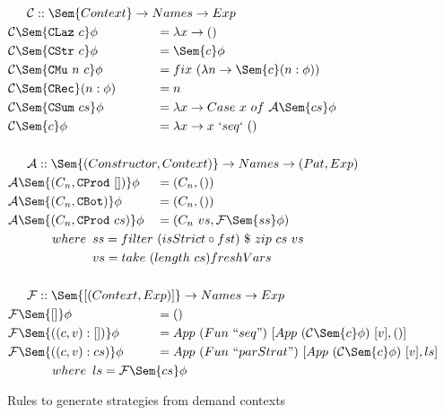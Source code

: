 \begin{figure}[h!]
\begin{displaymath}
  \begin{aligned}
   \noalign{$\mathcal{C} :: \Sem{Context} \rightarrow Names \rightarrow Exp $}
    & \mathcal{C}\Sem{\texttt{CLaz} \   c}    \phi  &&= \lambda x \rightarrow () \\
    & \mathcal{C}\Sem{\texttt{CStr} \  c}     \phi  &&= \Sem{c} \phi \\
    & \mathcal{C}\Sem{\texttt{CMu} \  n \  c} \phi  &&= fix \ (\lambda n \rightarrow \Sem{c} (n:\phi)) \\
    & \mathcal{C}\Sem{\texttt{CRec}}       (n:\phi) &&= n \\
    & \mathcal{C}\Sem{\texttt{CSum} \ cs}     \phi  &&= \lambda x \rightarrow Case \ x \ of \ \mathcal{A}\Sem{cs} \phi \\
    & \mathcal{C}\Sem{c}                      \phi  &&= \lambda x \rightarrow x \  `seq` \ () \\
    & \quad && \\
    \noalign{$\mathcal{A} :: \Sem{(Constructor, Context)} \rightarrow Names \rightarrow (Pat, Exp) $}
    & \mathcal{A}\Sem{(C_{n}, \texttt{CProd} \  [])} \phi &&= (C_{n}, ()) \\
    & \mathcal{A}\Sem{(C_{n}, \texttt{CBot})}        \phi &&= (C_{n}, ()) \\
    & \mathcal{A}\Sem{(C_{n}, \texttt{CProd} \  cs)} \phi &&= (C_{n} \ vs, \mathcal{F}\Sem{ss} \phi) \\
    \noalign{$\qquad where \enspace ss = filter \ (isStrict \circ fst) \ \$ \ zip \ cs \ vs $} 
    \noalign{$\qquad \hphantom{where} \enspace vs = take \ (length \ cs) freshVars $}
    & \quad && \\
    \noalign{$\mathcal{F} :: \Sem{[(Context, Exp)]} \rightarrow Names \rightarrow Exp $}
    & \mathcal{F}\Sem{[]} \phi           &&= () \\
    & \mathcal{F}\Sem{((c, v):[])} \phi  &&= App \ (Fun \ ``seq") \ [App \ (\mathcal{C}\Sem{c} \phi)\  [v], ()] \\
    & \mathcal{F}\Sem{((c, v):cs)} \phi  &&= App \ (Fun \ ``parStrat") \ [App \ (\mathcal{C}\Sem{c} \phi)\  [v], ls] \\
    \noalign{$\qquad where \enspace ls =  \mathcal{F}\Sem{cs} \phi$}
  \end{aligned}
\end{displaymath}
\caption{Rules to generate strategies from demand contexts}
\label{demStrat}
\end{figure}


